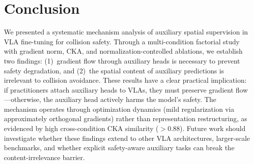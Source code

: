 \documentclass[10pt,letterpaper]{article}
\begin{document}
\section{Conclusion}
\label{sec:conclusion}

We presented a systematic mechanism analysis of auxiliary spatial supervision in VLA fine-tuning for collision safety. Through a multi-condition factorial study with gradient norm, CKA, and normalization-controlled ablations, we establish two findings: (1)~gradient flow through auxiliary heads is necessary to prevent safety degradation, and (2)~the spatial content of auxiliary predictions is irrelevant to collision avoidance. These results have a clear practical implication: if practitioners attach auxiliary heads to VLAs, they must preserve gradient flow---otherwise, the auxiliary head actively harms the model's safety. The mechanism operates through optimization dynamics (mild regularization via approximately orthogonal gradients) rather than representation restructuring, as evidenced by high cross-condition CKA similarity ($> 0.88$). Future work should investigate whether these findings extend to other VLA architectures, larger-scale benchmarks, and whether explicit safety-aware auxiliary tasks can break the content-irrelevance barrier.


\end{document}
